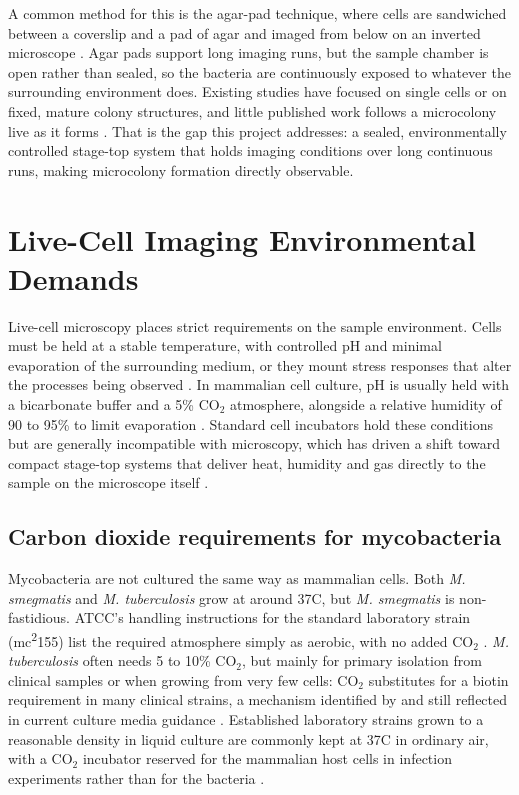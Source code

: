 A common method for this is the agar-pad technique, where cells are sandwiched between a coverslip and a pad of agar and imaged from below on an inverted microscope \citep{joyce_modified_2011}. Agar pads support long imaging runs, but the sample chamber is open rather than sealed, so the bacteria are continuously exposed to whatever the surrounding environment does. Existing studies have focused on single cells or on fixed, mature colony structures, and little published work follows a microcolony live as it forms \citep{chung_single-cell_2024,aldridge_asymmetry_2012,davis_defining_2016,julian_microscopic_2010}. That is the gap this project addresses: a sealed, environmentally controlled stage-top system that holds imaging conditions over long continuous runs, making microcolony formation directly observable.

\section{Live-Cell Imaging Environmental Demands}
\label{sec:environmental-demands}

Live-cell microscopy places strict requirements on the sample environment. Cells must be held at a stable temperature, with controlled pH and minimal evaporation of the surrounding medium, or they mount stress responses that alter the processes being observed \citep{frigault_live-cell_2009}. In mammalian cell culture, pH is usually held with a bicarbonate buffer and a 5\% CO$_2$ atmosphere, alongside a relative humidity of 90 to 95\% to limit evaporation \citep{talebipour_facilitating_2024,coutu_probing_2013}. Standard cell incubators hold these conditions but are generally incompatible with microscopy, which has driven a shift toward compact stage-top systems that deliver heat, humidity and gas directly to the sample on the microscope itself \citep{talebipour_facilitating_2024}.

\subsection{Carbon dioxide requirements for mycobacteria}
\label{subsec:myco-co2-humidity}

Mycobacteria are not cultured the same way as mammalian cells. Both \textit{M. smegmatis} and \textit{M. tuberculosis} grow at around 37\textdegree{}C, but \textit{M. smegmatis} is non-fastidious. ATCC's handling instructions for the standard laboratory strain (mc\textsuperscript{2}155) list the required atmosphere simply as aerobic, with no added CO$_2$ \citep{atcc_mycobacterium_smegmatis}. \textit{M. tuberculosis} often needs 5 to 10\% CO$_2$, but mainly for primary isolation from clinical samples or when growing from very few cells: CO$_2$ substitutes for a biotin requirement in many clinical strains, a mechanism identified by \citet{schaefer_roles_1955} and still reflected in current culture media guidance \citep{hardy_diagnostics_middlebrook_2020}. Established laboratory strains grown to a reasonable density in liquid culture are commonly kept at 37\textdegree{}C in ordinary air, with a CO$_2$ incubator reserved for the mammalian host cells in infection experiments rather than for the bacteria \citep{nazarova_growing_2017}.

